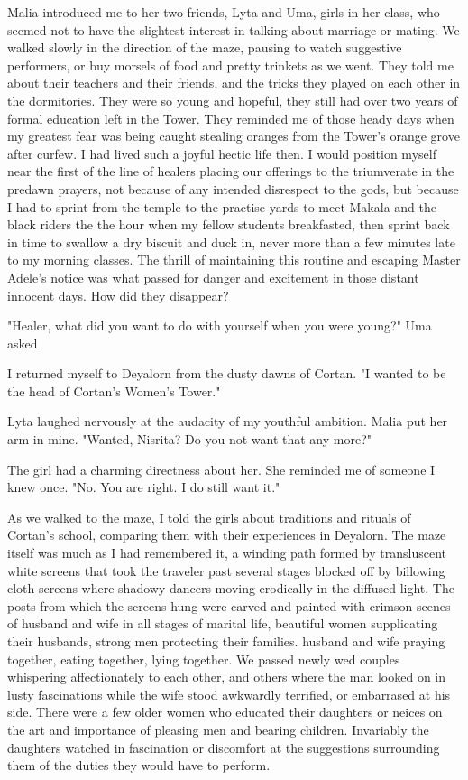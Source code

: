 \documentclass{article}
\begin{document}
Malia introduced me  to her two friends, Lyta and Uma, girls in her class, who seemed not to have the slightest interest in talking about marriage or mating. We walked slowly in the direction of the maze, pausing to watch suggestive performers, or buy morsels of food and pretty trinkets as we went. They told me about their teachers and their friends, and the tricks they played on each other in the dormitories. They were so young and hopeful, they still had over two years of formal education left in the Tower. They reminded me of those heady days when my greatest fear was being caught stealing oranges from the Tower's orange grove after curfew. I had lived such a joyful hectic life then. I would position myself near the first of the line of healers placing our offerings to the triumverate in the predawn prayers, not because of any intended disrespect to the gods, but because I had to sprint from the temple to the practise yards to meet Makala and the black riders the the hour when my fellow students breakfasted, then sprint back in time to swallow a dry biscuit and duck in, never more than a few minutes late to my morning classes. The thrill of maintaining this routine and escaping Master Adele's notice was what passed for danger and excitement in those distant innocent days. How did they disappear?

"Healer, what did you want to do with yourself when you were young?" Uma asked 

I returned myself to Deyalorn from the dusty dawns of Cortan. "I wanted to be the head of Cortan's Women's Tower."

Lyta laughed nervously at the audacity of my youthful ambition. Malia put her arm in mine. "Wanted, Nisrita? Do you not want that any more?"

The girl had a charming directness about her. She reminded me of someone I knew once. "No. You are right. I do still want it."

As we walked to the maze, I told the girls about traditions and rituals of Cortan's school, comparing them with their experiences in Deyalorn. The maze itself was much as I had remembered it, a winding path formed by transluscent white screens that took the traveler past several stages blocked off by billowing cloth screens where shadowy dancers moving erodically in the diffused light. The posts from which the screens hung were carved and painted with crimson scenes of husband and wife in all stages of marital life, beautiful women supplicating their husbands, strong men protecting their families. husband and wife praying together, eating together, lying together. We passed newly wed couples whispering affectionately to each other, and others where the man looked on in lusty fascinations while the wife stood awkwardly terrified, or embarrased at his side. There were a few older women who educated their daughters or neices on the art and importance of pleasing men and bearing children. Invariably the daughters watched in fascination or discomfort at the suggestions surrounding them of the duties they would have to perform. 
\end{document}
